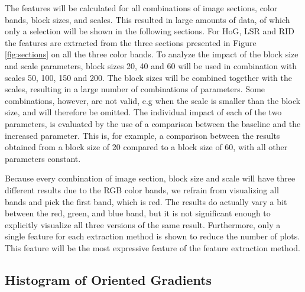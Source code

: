 The features will be calculated for all combinations of image sections, color
bands, block sizes, and scales. This resulted in large amounts of data, of
which only a selection will be shown in the following sections. For HoG, LSR and RID the features are extracted from the three sections presented in Figure
\ref{fig:sections} on all the three color bands. To analyze the impact of the
block size and scale parameters, block sizes 20, 40 and 60 will be used in
combination with scales 50, 100, 150 and 200. The block sizes will be combined
together with the scales, resulting in a large number of combinations of
parameters.  Some combinations, however, are not valid, e.g when the scale is
smaller than the block size, and will therefore be omitted. The individual
impact of each of the two parameters, is evaluated by the use of a comparison
between the baseline and the increased parameter. This is, for example,
a comparison between the results obtained from a block size of 20 compared to
a block size of 60, with all other parameters constant. 

Because every combination of image section, block size and scale will have
three different results due to the RGB color bands, we refrain from visualizing
all bands and pick the first band, which is red. The results do actually vary
a bit between the red, green, and blue band, but it is not significant enough
to explicitly visualize all three versions of the same result. Furthermore, only
a single feature for each extraction method is shown to reduce the number of
plots. This feature will be the most expressive feature of the feature extraction method.

\subsection{Histogram of Oriented Gradients}

